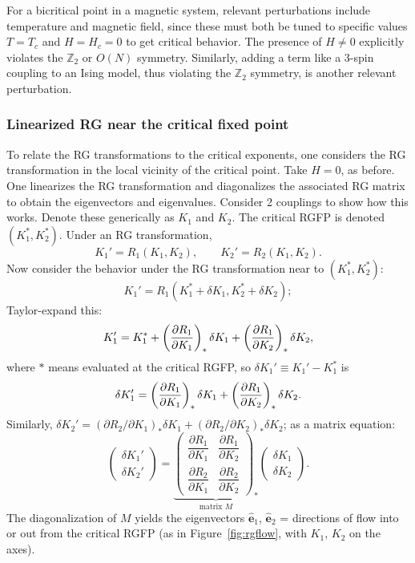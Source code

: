 For a bicritical point in a magnetic system, relevant perturbations include temperature and magnetic field,
since these must both be tuned to specific values $T = T_c$ and $H = H_c = 0$ to get critical behavior. The
presence of $H\ne 0$ explicitly violates the $\mathbb{Z}_2$ or $O(N)$ symmetry. Similarly, adding a term
like a 3-spin coupling to an Ising model, thus violating the $\mathbb{Z}_2$ symmetry, is another relevant
perturbation.

\subsubsection*{Linearized RG near the critical fixed point}

To relate the RG transformations to the critical exponents, one considers the RG transformation in the
local vicinity of the critical point. Take $H = 0$, as before. One linearizes the RG transformation and
diagonalizes the associated RG matrix to obtain the eigenvectors and eigenvalues. Consider 2 couplings to
show how this works. Denote these generically as $K_1$ and $K_2$. The critical RGFP is denoted
$(K_1^*,K_2^*)$. Under an RG transformation,
\begin{equation}
  K_1' = R_1(K_1,K_2),\qquad K_2' = R_2(K_1,K_2).
\end{equation}
Now consider the behavior under the RG transformation near to $(K_1^*,K_2^*)$:
\begin{equation}
  K_1' = R_1(K_1^*+\delta K_1,K_2^*+\delta K_2);
\end{equation}
Taylor-expand this:
\begin{equation}
  K_1' = K_1^* + \left(\frac{\partial R_1}{\partial K_1}\right)_*\delta K_1 + \left(\frac{\partial R_1}{\partial K_2}\right)_*\delta K_2,
\end{equation}
where $*$ means evaluated at the critical RGFP, so $\delta K_1'\equiv K_1'-K_1^*$ is
\begin{equation}
  \delta K_1' = \left(\frac{\partial R_1}{\partial K_1}\right)_*\delta K_1 + \left(\frac{\partial R_1}{\partial K_2}\right)_*\delta K_2 .
\end{equation}
Similarly,
$\delta K_2' = \left(\partial R_2/\partial K_1\right)_*\delta K_1 + \left(\partial R_2/\partial K_2\right)_*\delta K_2$; as a
matrix equation:
\begin{equation}
  \begin{pmatrix}\delta K_1'\\ \delta K_2'\end{pmatrix}
  = \underbrace{\begin{pmatrix}\dfrac{\partial R_1}{\partial K_1} & \dfrac{\partial R_1}{\partial K_2}\\[6pt] \dfrac{\partial R_2}{\partial K_1} & \dfrac{\partial R_2}{\partial K_2}\end{pmatrix}_*}_{\text{matrix } M}
    \begin{pmatrix}\delta K_1\\ \delta K_2\end{pmatrix}.
\end{equation}
The diagonalization of $M$ yields the eigenvectors $\hat{\mathbf e}_1$, $\hat{\mathbf e}_2$ = directions of
flow into or out from the critical RGFP (as in Figure~\ref{fig:rgflow}, with $K_1$, $K_2$ on the axes).

